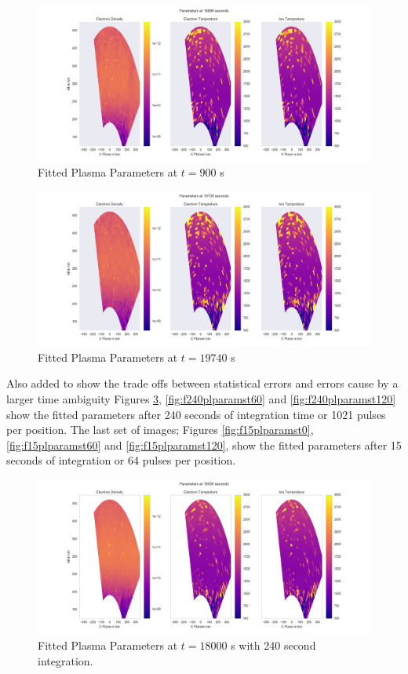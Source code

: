 \documentclass[draft,ras]{agutex}
\begin{document}
\begin{article}
\begin{figure}[!t]
\centering
\includegraphics[width=5in]{015_fitteddata_keep}
\caption{Fitted Plasma Parameters at $t=900$ s}
\label{fig:fplparamst60}
\end{figure}


\begin{figure}[!t]
\centering
\includegraphics[width=5in]{029_fitteddata_keep}
\caption{Fitted Plasma Parameters at $t=19740$ s}
\label{fig:fplparamst120}
\end{figure}


Also added to show the trade offs between statistical errors and errors cause by a larger time ambiguity Figures \ref{fig:f240plparamst0}, \ref{fig:f240plparamst60} and \ref{fig:f240plparamst120} show the fitted parameters after 240 seconds of integration time or 1021 pulses per position. The last set of images; Figures \ref{fig:f15plparamst0}, \ref{fig:f15plparamst60} and \ref{fig:f15plparamst120}, show the fitted parameters after 15 seconds of integration or 64 pulses per position.

\begin{figure}[!t]
\centering
\includegraphics[width=5in]{0000_240_int}
\caption{Fitted Plasma Parameters at $t=18000$ s with 240 second integration.}
\label{fig:f240plparamst0}
\end{figure}


\end{article}
\end{document}
